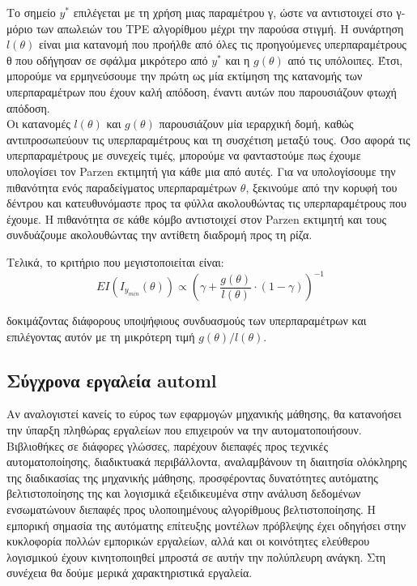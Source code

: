 \documentclass{article}
\begin{document}
Το σημείο $y^*$ επιλέγεται με τη χρήση μιας παραμέτρου γ, ώστε να αντιστοιχεί στο γ-μόριο των απωλειών του TPE αλγορίθμου μέχρι την παρούσα στιγμή. Η συνάρτηση $l(\theta)$ είναι μια κατανομή που προήλθε από όλες τις προηγούμενες υπερπαραμέτρους θ που οδήγησαν σε σφάλμα μικρότερο από $y^*$ και η $g(\theta)$ από τις υπόλοιπες. Έτσι, μπορούμε να ερμηνεύσουμε την πρώτη ως μία εκτίμηση της κατανομής των υπερπαραμέτρων που έχουν καλή απόδοση, έναντι αυτών που παρουσιάζουν φτωχή απόδοση.
\\

Οι κατανομές $l(\theta)$ και $g(\theta)$ παρουσιάζουν μία ιεραρχική δομή, καθώς αντιπροσωπεύουν τις υπερπαραμέτρους και τη συσχέτιση μεταξύ τους. Όσο αφορά τις υπερπαραμέτρους με συνεχείς τιμές, μπορούμε να φανταστούμε πως έχουμε  υπολογίσει τον Parzen εκτιμητή για κάθε μια από αυτές. Για να υπολογίσουμε την πιθανότητα ενός παραδείγματος υπερπαραμέτρων $\theta$, ξεκινούμε από την κορυφή του δέντρου και κατευθυνόμαστε προς τα φύλλα ακολουθώντας τις υπερπαραμέτρους που έχουμε. Η πιθανότητα σε κάθε κόμβο αντιστοιχεί στον Parzen εκτιμητή και τους συνδυάζουμε ακολουθώντας την αντίθετη διαδρομή προς τη ρίζα.

Τελικά, το κριτήριο που μεγιστοποιείται είναι:
$$EI(I_{y_{min}}(\theta)) \propto (\gamma + \frac{g(\theta)}{l(\theta)} \cdot (1- \gamma))^{-1}  $$

δοκιμάζοντας διάφορους υποψήφιους συνδυασμούς των υπερπαραμέτρων και επιλέγοντας αυτόν με τη μικρότερη τιμή $g(\theta)/l(\theta)$.

\subsection{Σύγχρονα εργαλεία automl}
Αν αναλογιστεί κανείς το εύρος των εφαρμογών μηχανικής μάθησης, θα κατανοήσει την ύπαρξη πληθώρας εργαλείων που επιχειρούν να την αυτοματοποιήσουν. Βιβλιοθήκες σε διάφορες γλώσσες, παρέχουν διεπαφές προς τεχνικές αυτοματοποίησης, διαδικτυακά περιβάλλοντα,  αναλαμβάνουν τη διαιτησία ολόκληρης της διαδικασίας της μηχανικής μάθησης, προσφέροντας δυνατότητες αυτόματης βελτιστοποίησης της και λογισμικά εξειδικευμένα στην ανάλυση δεδομένων ενσωματώνουν διεπαφές προς υλοποιημένους αλγορίθμους βελτιστοποίησης. Η εμπορική σημασία της αυτόματης επίτευξης μοντέλων πρόβλεψης έχει οδηγήσει στην κυκλοφορία πολλών εμπορικών εργαλείων, αλλά και οι κοινότητες ελεύθερου λογισμικού έχουν κινητοποιηθεί μπροστά σε αυτήν την πολύπλευρη ανάγκη. Στη συνέχεια θα δούμε μερικά χαρακτηριστικά εργαλεία.
\end{document}
